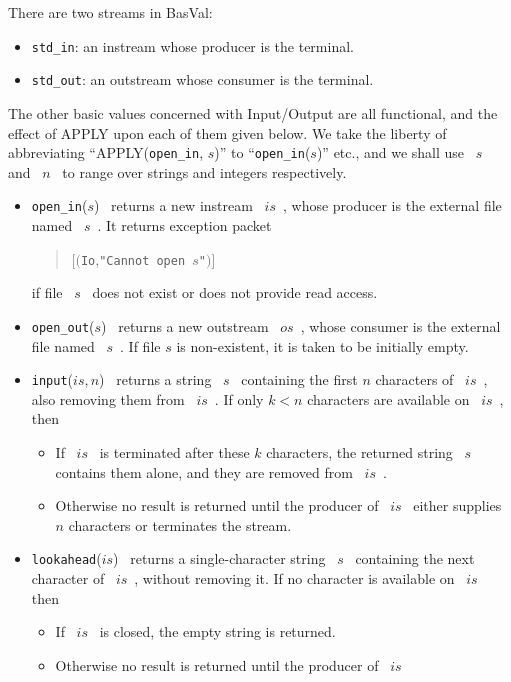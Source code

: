 There are two streams in BasVal:
\begin{itemize}
\item  {\tt std\_in}: an instream whose producer is the terminal.
\item  {\tt std\_out}: an outstream whose consumer is the terminal.
\end{itemize}
The other basic values concerned with Input/Output are all functional, and
the effect of APPLY upon each of them given below. We take the
liberty of abbreviating ``APPLY({\tt open\_in}, $s$)'' to 
``{\tt open\_in}($s$)''
etc., and
we shall use ~$s$~ and ~$n$~ to range over strings and integers
respectively.
\begin{itemize}
\item  {\tt open\_in}($s$)~ returns a new instream ~$is$~, whose producer is
       the external file named ~$s$~. It returns exception packet
       \begin{quote}
       [$(${\tt Io},\verb+"Cannot open +$s$\verb+"+$)$]
       \end{quote}
       if file ~$s$~ does not exist or does not provide read access.
\item  {\tt open\_out}($s$)~ returns a new outstream ~$os$~, whose consumer is
       the
       external file named ~$s$~. If file $s$ is non-existent, it is taken to
       be initially empty.
\item  {\tt input}($is,n$)~ returns a string ~$s$~ containing the first $n$
       characters of ~$is$~, also removing them from ~$is$~.  If only $k<n$
       characters are available on ~$is$~, then
       \begin{itemize}
       \item If ~$is$~ is terminated after these $k$ characters, the
             returned string
            ~$s$~ contains them alone, and they are removed from ~$is$~.
       \item Otherwise no result is returned until the producer of ~$is$~
             either supplies $n$ characters or terminates the stream.
       \end{itemize}
\item  {\tt lookahead}($is$)~ returns a single-character string ~$s$~ containing
       the next character of ~$is$~, without removing it. If no character is
       available on ~$is$~ then
       \begin{itemize}
       \item If ~$is$~ is closed, the empty string is returned.
       \item Otherwise no result is returned until the producer of ~$is$~

\end{itemize}
\end{itemize}
